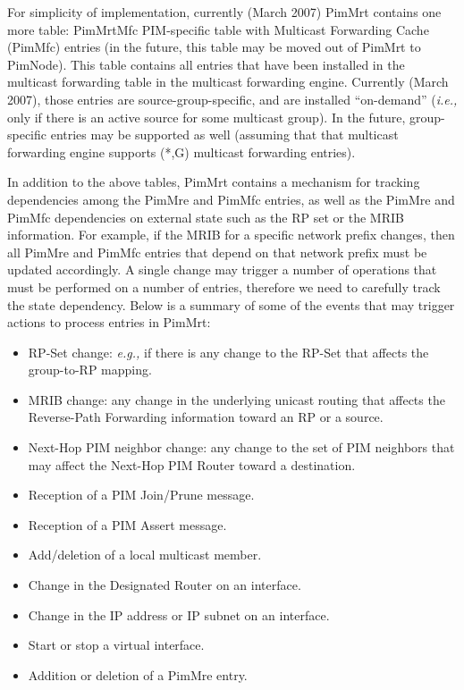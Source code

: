 \documentclass[11pt]{article}
\newcommand{\ie}{\emph{i.e.,}\xspace}
\newcommand{\eg}{\emph{e.g.,}\xspace}
\begin{document}
For simplicity of implementation, currently (March 2007) PimMrt
contains one more table: PimMrtMfc PIM-specific table with Multicast
Forwarding Cache (PimMfc) entries (in the future, this table may be
moved out of PimMrt to PimNode). This table contains all
entries that have been installed in the multicast forwarding table in
the multicast forwarding engine. Currently (March 2007), those
entries are source-group-specific, and are installed ``on-demand'' (\ie
only if there is an active source for some multicast group). In the future,
group-specific entries may be supported as well (assuming that that
multicast forwarding engine supports (*,G) multicast forwarding
entries).

In addition to the above tables, PimMrt contains a mechanism for
tracking dependencies among the PimMre and PimMfc entries, as well as
the PimMre and PimMfc dependencies on external state such as the RP set
or the MRIB information. For example, if the MRIB for a specific network
prefix changes, then all PimMre and PimMfc entries that depend on that
network prefix must be updated accordingly. A single change may trigger
a number of operations that must be performed on a number of entries,
therefore we need to carefully track the state dependency. Below is a
summary of some of the events that may trigger actions to process
entries in PimMrt:

\begin{itemize}

  \item RP-Set change: \eg if there is any change to the RP-Set that
  affects the group-to-RP mapping.

  \item MRIB change: any change in the underlying unicast routing that
  affects the Reverse-Path Forwarding information toward an RP or a
  source.

  \item Next-Hop PIM neighbor change: any change to the set of PIM
  neighbors that may affect the Next-Hop PIM Router toward a destination.

  \item Reception of a PIM Join/Prune message.

  \item Reception of a PIM Assert message.

  \item Add/deletion of a local multicast member.

  \item Change in the Designated Router on an interface.

  \item Change in the IP address or IP subnet on an interface.

  \item Start or stop a virtual interface.

  \item Addition or deletion of a PimMre entry.

\end{itemize}
\end{document}

